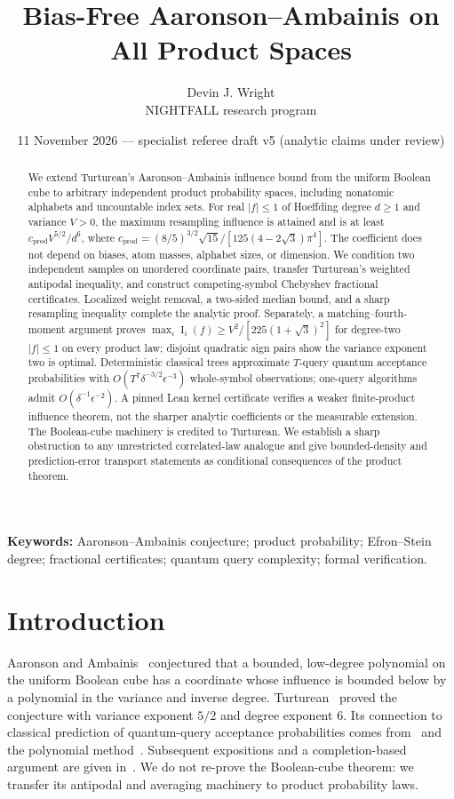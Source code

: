\documentclass[11pt]{article}
\title{Bias-Free Aaronson--Ambainis on All Product Spaces}
\author{Devin J. Wright\\\small NIGHTFALL research program}
\date{11 November 2026 --- specialist referee draft v5 (analytic claims under review)}
\numberwithin{equation}{section}
\theoremstyle{remark}
\newcommand{\Inf}{\operatorname{I}}
\newcommand{\cprod}{c_{\mathrm{prod}}}
\begin{document}
\maketitle
\begin{abstract}
We extend Turturean's Aaronson--Ambainis influence bound from the uniform Boolean cube to arbitrary independent product probability spaces, including nonatomic alphabets and uncountable index sets. For real $|f|\le1$ of Hoeffding degree $d\ge1$ and variance $V>0$, the maximum resampling influence is attained and is at least $\cprod V^{5/2}/d^6$, where $\cprod=(8/5)^{3/2}\sqrt{15}/[125(4-2\sqrt3)\pi^4]$. The coefficient does not depend on biases, atom masses, alphabet sizes, or dimension. We condition two independent samples on unordered coordinate pairs, transfer Turturean's weighted antipodal inequality, and construct competing-symbol Chebyshev fractional certificates. Localized weight removal, a two-sided median bound, and a sharp resampling inequality complete the analytic proof. Separately, a matching--fourth-moment argument proves $\max_i\Inf_i(f)\ge V^2/[225(1+\sqrt3)^2]$ for degree-two $|f|\le1$ on every product law; disjoint quadratic sign pairs show the variance exponent two is optimal. Deterministic classical trees approximate $T$-query quantum acceptance probabilities with $O(T^7\delta^{-3/2}\epsilon^{-3})$ whole-symbol observations; one-query algorithms admit $O(\delta^{-1}\epsilon^{-2})$. A pinned Lean kernel certificate verifies a weaker finite-product influence theorem, not the sharper analytic coefficients or the measurable extension. The Boolean-cube machinery is credited to Turturean. We establish a sharp obstruction to any unrestricted correlated-law analogue and give bounded-density and prediction-error transport statements as conditional consequences of the product theorem.
\end{abstract}
\noindent\textbf{Keywords:} Aaronson--Ambainis conjecture; product probability; Efron--Stein degree; fractional certificates; quantum query complexity; formal verification.

\section{Introduction}\label{sec:intro}
Aaronson and Ambainis~\cite[Conjecture~1.7]{AA14} conjectured that a bounded, low-degree polynomial on the uniform Boolean cube has a coordinate whose influence is bounded below by a polynomial in the variance and inverse degree. Turturean~\cite[Theorem~1.1]{Tur26} proved the conjecture with variance exponent $5/2$ and degree exponent $6$. Its connection to classical prediction of quantum-query acceptance probabilities comes from~\cite[Theorem~3.3]{AA14} and the polynomial method~\cite{BBCMW01}. Subsequent expositions and a completion-based argument are given in~\cite{BDST26,HMP26}. We do not re-prove the Boolean-cube theorem: we transfer its antipodal and averaging machinery to product probability laws.
\end{document}
